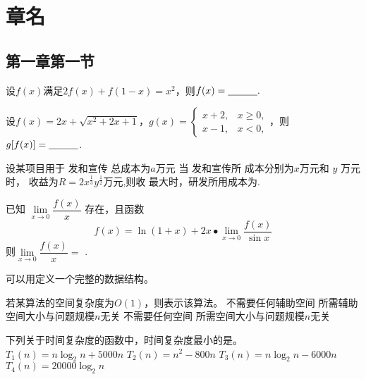 \section{章名}
\subsection{第一章第一节}

\begin{questions}[tr]
    \begin{bbox}
        \question   设$f(x)$满足$2f(x)+f(1-x)=x^2$，则$f(x)=\underline{\hspace{3em}}.$
    \end{bbox}

    \begin{bbox}
        \question   设$f(x)=2x+\sqrt{x^{2}+2x+1}$，$g(x)=
        \begin{cases}
        x+2, & x\geqslant0, \\
        x-1, & x<0,  
        \end{cases}$，则$g[f(x)]= \underline{\hspace{3em}}$.
            \end{bbox}

    \begin{bbox}
 
        \question   设某项目用于 发和宣传 总成本为$a$万元 当 发和宣传所 成本分别为$x$万元和 $y$ 万元时， 收益为$R=2x^{\frac{1}{3}}y^{\frac{1}{2}}$万元,则收 最大时，研发所用成本为\blankline.
        
    \end{bbox}

    \begin{bbox}
        \question   已知 $\lim\limits_{x\to0}\dfrac{f(x)}{x}$ 存在，且函数
        $$f(x)=\ln(1+x)+2x\bullet\lim_{x\to0}\frac{f(x)}{\sin x}$$
        则$\lim\limits_{x\to0}\dfrac{f(x)}{x}=$ \blankline.
    \end{bbox}
    \begin{bbox}
        \question   可以用\blankbox 定义一个完整的数据结构。
    \end{bbox}
    \begin{bbox}
        \question   若某算法的空间复杂度为$O(1)$，则表示该算法\blankbox 。
        \fourchoices
        {不需要任何辅助空间}
        {所需辅助空间大小与问题规模$n$无关}
        {不需要任何空间}
        {所需空间大小与问题规模$n$无关}
    \end{bbox}

    \begin{bbox}
        \question   下列关于时间复杂度的函数中，时间复杂度最小的是\blankbox 。
        \fourchoices
        {$T_1(n)=n\log_2n +5000n$}
        {$T_2(n)=n^2 - 800n$}
        {$T_3(n)=n\log_2n - 6000n$}
        {$T_4(n)=20000\log_2n$}
    \end{bbox}


\end{questions}
